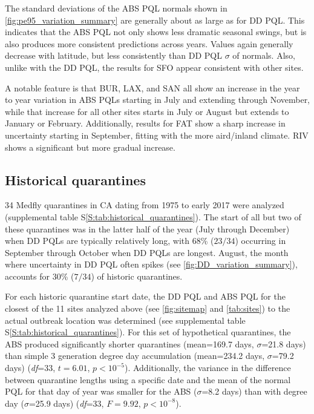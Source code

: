 \documentclass[10pt,a4paper,twocolumn]{article}
\begin{document}
The standard deviations of the ABS PQL normals 
shown in \autoref{fig:pe95_variation_summary}
are generally about  as large as for DD PQL.
This indicates that the ABS PQL not only shows less dramatic seasonal swings, 
but is also produces more consistent predictions across years.
Values again generally decrease with latitude, but less consistently than DD PQL $\sigma$ of normals.
Also, unlike with the DD PQL, the results for SFO appear consistent with other sites.

A notable feature is that BUR, LAX, and SAN all show an increase in the year to year variation
in ABS PQLs starting in July and extending through November, 
while that increase for all other sites starts in July or August 
but extends to January or February.
Additionally, results for FAT show a sharp increase in uncertainty starting in September, fitting with the 
more aird/inland climate.  RIV shows a significant but more gradual increase.

\subsection*{Historical quarantines}

34 Medfly quarantines in CA dating from 1975 to early 2017 were analyzed
(supplemental table S\ref{S:tab:historical_quarantines}).
The start of all but two of these quarantines was in the latter half of the year
(July through December) when DD PQLs are typically relatively long,
with 68\% ($23/34$) occurring in September through October when DD PQLs are
longest. 
August, the month where uncertainty in DD PQL often spikes 
(see \autoref{fig:DD_variation_summary}), 
accounts for 30\% ($7/34$) of historic quarantines.

For each historic quarantine start date, the DD PQL and ABS PQL 
for the closest of the 11 sites analyzed above (see \autoref{fig:sitemap} and \autoref{tab:sites}) 
to the actual outbreak location was determined
(see supplemental table S\ref{S:tab:historical_quarantines}).
For this set of hypothetical quarantines, 
the ABS produced significantly shorter quarantines
(mean=169.7 days, $\sigma$=21.8 days)
than simple 3 generation degree day accumulation
(mean=234.2 days, $\sigma$=79.2 days)
(\textit{df}=33, $t{=}6.01$, $p{<}10^{-5}$).
Additionally, the variance in the difference between quarantine lengths
using a specific date and the mean of the normal PQL for that day of year
was smaller for the ABS ($\sigma$=8.2 days)
than with degree day ($\sigma$=25.9 days)
(\textit{df}=33, $F{=}9.92$, $p{<}10^{-8}$).
\end{document}
